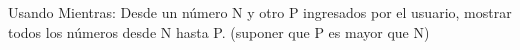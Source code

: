 ﻿
Usando Mientras: Desde un número N y otro P ingresados por el usuario, mostrar todos los números desde N hasta P. (suponer que P es mayor que N)



\volverindice
\newpage
